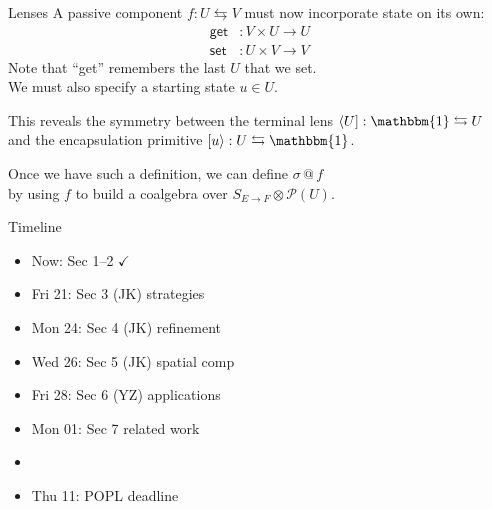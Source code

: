 \documentclass[aspectratio=1610]{beamer}
\begin{document}
\begin{frame}{Lenses}
A passive component $f : U \leftrightarrows V$
must now incorporate state on its own:
\begin{align*}
  \mathsf{get} &: V \times U \rightarrow U \\
  \mathsf{set} &: U \times V \rightarrow V
\end{align*}
Note that ``get'' remembers the last $U$ that we set. \\
We must also specify a starting state $u \in U$.

\vfill
This reveals the symmetry between the terminal lens
$\langle U ] : \mathbbm{1} \leftrightarrows U$ \\
and the encapsulation primitive
$[ u \rangle : U \leftrightarrows \mathbbm{1}$.

\vfill
Once we have such a definition,
we can define $\sigma \mathbin@ f$ \\
by using $f$ to build a coalgebra over $S_{E \rightarrow F} \otimes \mathcal{P}(U)$.

\end{frame}

\begin{frame}{Timeline}
\begin{itemize}
  \item Now: Sec 1--2 $\checkmark$
  \item Fri 21: Sec 3 (JK) strategies
  \item Mon 24: Sec 4 (JK) refinement
  \item Wed 26: Sec 5 (JK) spatial comp
  \item Fri 28: Sec 6 (YZ) applications
  \item Mon 01: Sec 7 related work
  \item 
  \item Thu 11: POPL deadline
\end{itemize}
\end{frame}
\end{document}
